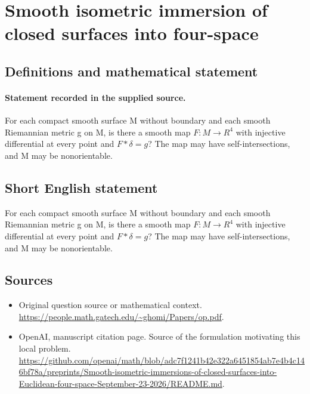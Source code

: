 \documentclass[11pt]{article}
\begin{document}
\section*{Smooth isometric immersion of closed surfaces into four-space}\label{statement}
\subsection{Definitions and mathematical statement}
\paragraph{Statement recorded in the supplied source.}
For each compact smooth surface M without boundary and each smooth Riemannian metric g on M, is there a smooth map $F:M\to R^{4}$ with injective differential at every point and $F*\delta =g$? The map may have self-intersections, and M may be nonorientable.
\subsection{Short English statement}
For each compact smooth surface M without boundary and each smooth Riemannian metric g on M, is there a smooth map $F:M\to R^{4}$ with injective differential at every point and $F*\delta =g$? The map may have self-intersections, and M may be nonorientable.
\subsection{Sources}
\begin{itemize}
\item[S1] Original question source or mathematical context.
\url{https://people.math.gatech.edu/~ghomi/Papers/op.pdf}.
\item[S2] OpenAI, manuscript citation page. Source of the formulation motivating this local problem.
\url{https://github.com/openai/math/blob/adc7f1241b42e322a6451854ab7e4b4c146bf78a/preprints/Smooth-isometric-immersions-of-closed-surfaces-into-Euclidean-four-space-September-23-2026/README.md}.
\end{itemize}
\end{document}
